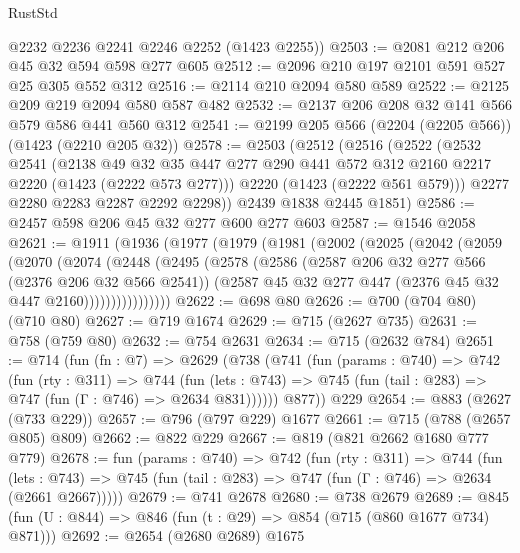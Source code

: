 \begin{lexlean}{RustStd}
\begin{coremodule}
      @2232
      @2236
      @2241
      @2246
      @2252
      (@1423 @2255))
@2503 := @2081 @212 @206 @45 @32 @594 @598 @277 @605
@2512 := @2096 @210 @197 @2101 @591 @527 @25 @305 @552 @312
@2516 := @2114 @210 @2094 @580 @589
@2522 := @2125 @209 @219 @2094 @580 @587 @482
@2532 := @2137 @206 @208 @32 @141 @566 @579 @586 @441 @560 @312
@2541 := @2199 @205 @566 (@2204 (@2205 @566)) (@1423 (@2210 @205 @32))
@2578 := @2503
    (@2512
      (@2516
        (@2522
          (@2532
            @2541
            (@2138
              @49
              @32
              @35
              @447
              @277
              @290
              @441
              @572
              @312
              @2160
              @2217
              @2220
              (@1423 (@2222 @573 @277)))
            @2220
            (@1423 (@2222 @561 @579)))
          @2277
          @2280
          @2283
          @2287
          @2292
          @2298))
      @2439
      @1838
      @2445
      @1851)
@2586 := @2457 @598 @206 @45 @32 @277 @600 @277 @603
@2587 := @1546 @2058
@2621 := @1911
    (@1936
      (@1977
        (@1979
          (@1981
            (@2002
              (@2025
                (@2042
                  (@2059
                    (@2070
                      (@2074
                        (@2448
                          (@2495
                            (@2578
                              (@2586
                                (@2587 @206 @32 @277 @566 (@2376 @206 @32 @566 @2541))
                                (@2587 @45 @32 @277 @447 (@2376 @45 @32 @447 @2160))))))))))))))))
@2622 := @698 @80
@2626 := @700 (@704 @80) (@710 @80)
@2627 := @719 @1674
@2629 := @715 (@2627 @735)
@2631 := @758 (@759 @80)
@2632 := @754 @2631
@2634 := @715 (@2632 @784)
@2651 := @714
    (fun (fn : @7) =>
    @2629
      (@738
        (@741
          (fun (params : @740) =>
          @742
            (fun (rty : @311) =>
            @744
              (fun (lets : @743) =>
              @745 (fun (tail : @283) => @747 (fun (Γ : @746) => @2634 @831))))))
        @877))
    @229
@2654 := @883 (@2627 (@733 @229))
@2657 := @796 (@797 @229) @1677
@2661 := @715 (@788 (@2657 @805) @809)
@2662 := @822 @229
@2667 := @819 (@821 @2662 @1680 @777 @779)
@2678 := fun (params : @740) =>
  @742
    (fun (rty : @311) =>
    @744
      (fun (lets : @743) =>
      @745 (fun (tail : @283) => @747 (fun (Γ : @746) => @2634 (@2661 @2667)))))
@2679 := @741 @2678
@2680 := @738 @2679
@2689 := @845 (fun (U : @844) => @846 (fun (t : @29) => @854 (@715 (@860 @1677 @734) @871)))
@2692 := @2654 (@2680 @2689) @1675

\end{coremodule}
\end{lexlean}
